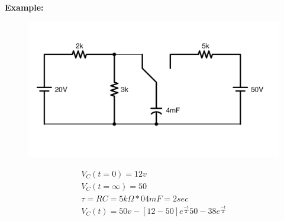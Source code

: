 \documentclass[a4paper,12]{article}
\begin{document}
  \textbf{Example:}
  \begin{figure}[H]
      \centering
      \includegraphics[width=120mm]{Image/33.jpeg}
  \end{figure}
  \begin{gather}
      V_C(t=0)=12v\\
      V_C(t=\infty)=50\\
      \tau=RC=5k\Omega *04mF=2sec\\
      V_C(t)=50v-[12-50]e^{\frac{-t}{2}}50-38e^{\frac{-t}{2}}
  \end{gather}
\end{document}
